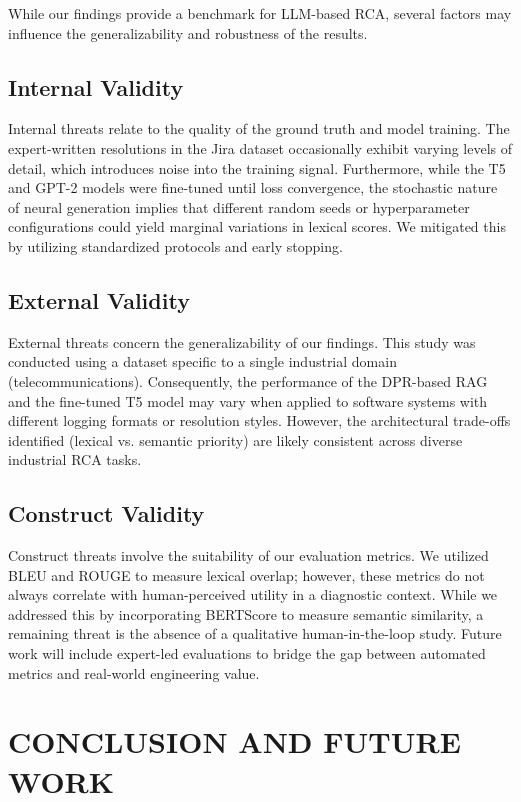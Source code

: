 \documentclass[10pt,twocolumn,journal]{IEEEtran}
\begin{document}
While our findings provide a benchmark for LLM-based RCA, several factors may influence the generalizability and robustness of the results.

\subsection{Internal Validity}
Internal threats relate to the quality of the ground truth and model training. The expert-written resolutions in the Jira dataset occasionally exhibit varying levels of detail, which introduces noise into the training signal. Furthermore, while the T5 and GPT-2 models were fine-tuned until loss convergence, the stochastic nature of neural generation implies that different random seeds or hyperparameter configurations could yield marginal variations in lexical scores. We mitigated this by utilizing standardized protocols and early stopping.

\subsection{External Validity}
External threats concern the generalizability of our findings. This study was conducted using a dataset specific to a single industrial domain (telecommunications). Consequently, the performance of the DPR-based RAG and the fine-tuned T5 model may vary when applied to software systems with different logging formats or resolution styles. However, the architectural trade-offs identified (lexical vs. semantic priority) are likely consistent across diverse industrial RCA tasks.

\subsection{Construct Validity}
Construct threats involve the suitability of our evaluation metrics. We utilized BLEU and ROUGE to measure lexical overlap; however, these metrics do not always correlate with human-perceived utility in a diagnostic context. While we addressed this by incorporating BERTScore to measure semantic similarity, a remaining threat is the absence of a qualitative human-in-the-loop study. Future work will include expert-led evaluations to bridge the gap between automated metrics and real-world engineering value.

\section{CONCLUSION AND FUTURE WORK}
\label{sec:conclusion}
\end{document}

